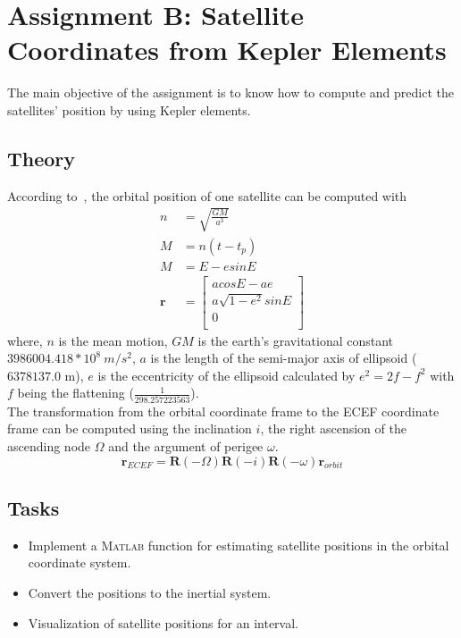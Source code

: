 \chapter{Assignment B: Satellite Coordinates from Kepler Elements}
The main objective of the assignment is to know how to compute and predict the satellites' position by using Kepler elements.

\section{Theory}
According to~\cite{misra2006global}, the orbital position of one satellite can be computed with
\begin{align}
	n &= \sqrt{\frac{GM}{a^3}} \\
	M & = n(t-t_p) \\
	M & = E-esinE \\
	\mathbf{r}&=\left[\begin{matrix}
		acosE-ae \\
		a\sqrt{1-e^2}sinE \\
		0 \\
	\end{matrix}\right]
\end{align}
where, $n$ is the mean motion, $GM$ is the earth's gravitational constant $3986004.418*10^8\ m/s^2$, $a$ is the length of the semi-major axis of ellipsoid ($6378137.0$ m), $e$ is the eccentricity of the ellipsoid calculated by $e^2=2f-f^2$ with $f$ being the flattening ($\frac{1}{298.257223563}$). \\
The transformation from the orbital coordinate frame to the ECEF coordinate frame can be computed using the inclination $i$, the right ascension of the ascending node $\Omega$ and the argument of perigee $\omega$.
\begin{equation}
\mathbf{r}_{ECEF}=\mathbf{R}(-\Omega)\mathbf{R}(-i)\mathbf{R}(-\omega)\mathbf{r}_{orbit}
\end{equation}

\section{Tasks}
\begin{itemize}
	\item Implement a \textsc{Matlab} function for estimating satellite positions in the orbital coordinate system.
	\item Convert the positions to the inertial system.
	\item Visualization of satellite positions for an interval.
\end{itemize}
